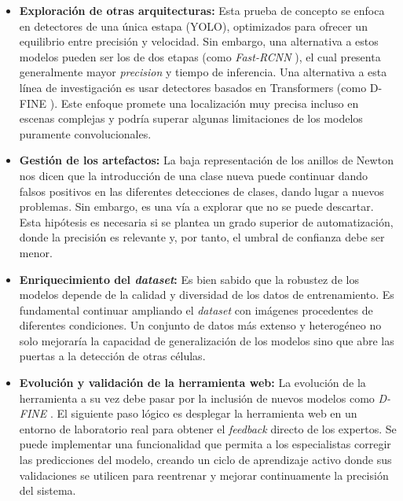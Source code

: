 \documentclass[12pt,a4paper,onecolumn,oneside]{report}
\begin{document}
\begin{itemize}
  \item \textbf{Exploración de otras arquitecturas:} Esta prueba de concepto se enfoca en detectores de una única estapa (YOLO), optimizados para ofrecer un equilibrio entre precisión y velocidad. Sin embargo, 
  una alternativa a estos modelos pueden ser los de dos etapas (como \textit{Fast-RCNN} \cite{7410526}), el cual presenta generalmente mayor \textit{precision} y tiempo de inferencia. Una alternativa a esta línea de investigación es usar detectores basados en Transformers
  (como D-FINE \cite{peng2024dfineredefineregressiontask}). Este enfoque promete una localización muy precisa incluso en escenas complejas y podría superar algunas limitaciones de los modelos puramente convolucionales.
  \item \textbf{Gestión de los artefactos:} La baja representación de los anillos de Newton nos dicen que la introducción de una clase nueva puede continuar dando falsos positivos en las diferentes detecciones de clases, dando lugar
  a nuevos problemas. Sin embargo, es una vía a explorar que no se puede descartar. Esta hipótesis es necesaria si se plantea un grado superior de automatización, donde la precisión es relevante y, por tanto, el umbral de confianza debe ser menor.
  \item \textbf{Enriquecimiento del \textit{dataset}:} Es bien sabido que la robustez de los modelos depende de la calidad y diversidad de los datos de entrenamiento. Es fundamental continuar ampliando el \textit{dataset} con imágenes procedentes de diferentes condiciones.
  Un conjunto de datos más extenso y heterogéneo no solo mejoraría la capacidad de generalización de los modelos sino que abre las puertas a la detección de otras células.
  \item \textbf{Evolución y validación de la herramienta web:} La evolución de la herramienta a su vez debe pasar por la inclusión de nuevos modelos como \textit{D-FINE} \cite{peng2024dfineredefineregressiontask}. El siguiente paso lógico es desplegar la herramienta web en un entorno de laboratorio real 
  para obtener el \textit{feedback} directo de los expertos. Se puede implementar una funcionalidad que permita a los especialistas corregir las predicciones del modelo, creando un ciclo de aprendizaje activo donde sus validaciones se utilicen para reentrenar y mejorar continuamente la precisión del sistema.
\end{itemize}

\renewcommand\bibname{Bibliografía}
\end{document}
